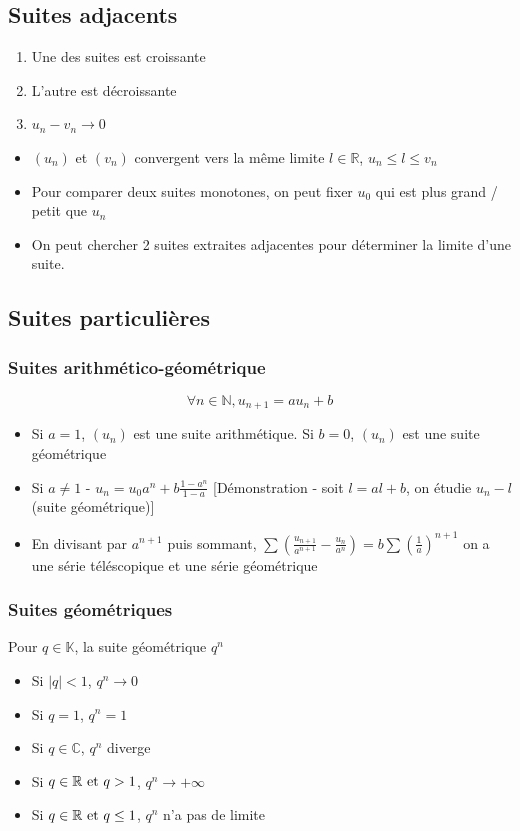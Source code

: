 \documentclass[openany]{book}
\begin{document}
\subsection{Suites adjacents}
\begin{enumerate}
    \item Une des suites est croissante
    \item L'autre est décroissante
    \item $ u_n - v_n \longrightarrow 0 $
\end{enumerate}
\begin{itemize}
    \item $(u_n)$ et $(v_n)$ convergent vers la même limite $ l \in \mathbb{R}$, $ u_n \leq l \leq v_n $
    \item Pour comparer deux suites monotones, on peut fixer $u_0$ qui est plus grand / petit que $u_n$
    \item On peut chercher 2 suites extraites adjacentes pour déterminer la limite d'une suite. 
\end{itemize}

\subsection{Suites particulières}

\subsubsection{Suites arithmético-géométrique}
\[ \forall n \in \mathbb{N}, u_{n+1} = a u_n + b \]
\begin{itemize}
    \item Si $a=1$, $(u_n)$ est une suite arithmétique. Si $b=0$, $(u_n)$ est une suite géométrique
    \item Si $a\neq1$ - $ u_n = u_0 a^n + b \frac{1-a^n}{1-a} $ [Démonstration - soit $ l = al + b $, on étudie $u_n-l$ (suite géométrique)]
    \item En divisant par $a^{n+1}$ puis sommant, $\sum \left( \frac{u_{n+1}}{a^{n+1}} - \frac{u_n}{a^n} \right) = b \sum (\frac{1}{a})^{n+1}$ on a une série téléscopique et une série géométrique
\end{itemize}

\subsubsection{Suites géométriques}
Pour $q \in \mathbb{K}$, la suite géométrique $q^n$
\begin{itemize}
    \item Si $|q| < 1$, $q^n \longrightarrow 0$
    \item Si $q= 1$, $q^n = 1$ 
    \item Si $ q \in \mathbb{C} $, $q^n$ diverge
    \item Si $ q \in \mathbb{R} \text{ et } q > 1 $, $q^n \longrightarrow +\infty$
    \item Si $q \in \mathbb{R} \text{ et } q \leq 1 $, $q^n$ n'a pas de limite
\end{itemize}
\end{document}
